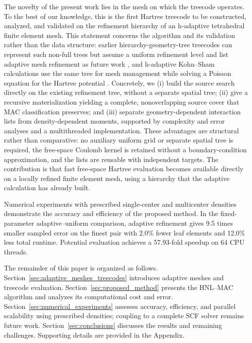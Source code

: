 \documentclass[a4paper,pdflatex,sn-mathphys-num]{sn-jnl}
\theoremstyle{thmstyleone}
\begin{document}
The novelty of the present work lies in the mesh on which the treecode
operates. To the best of our knowledge, this is the first Hartree treecode to be
constructed, analyzed, and validated on the refinement hierarchy of an
h-adaptive tetrahedral finite element mesh. This statement concerns the
algorithm and its validation rather than the data structure: earlier
hierarchy-geometry-tree treecodes can represent such non-full trees but assume a
uniform refinement level and list adaptive mesh refinement as future work
\cite{Cui,CuiYang2025,CuiYangHu2025}, and h-adaptive Kohn--Sham calculations use the same tree
for mesh management while solving a Poisson equation for the Hartree potential
\cite{Kuang2024}. Concretely, we (i) build the source search directly on the
existing refinement tree, without a separate spatial tree; (ii) give a recursive
materialization yielding a complete, nonoverlapping source cover that MAC
classification preserves; and (iii) separate geometry-dependent interaction
lists from density-dependent moments, supported by complexity and error
analyses and a multithreaded implementation. These advantages are structural
rather than comparative: no auxiliary uniform grid or separate spatial tree is
required, the free-space Coulomb kernel is retained without a
boundary-condition approximation, and the lists are reusable with independent
targets. The contribution is that fast free-space Hartree evaluation
becomes available directly on a locally refined finite element mesh, using a
hierarchy that the adaptive calculation has already built.

Numerical experiments with prescribed single-center and multicenter densities demonstrate the accuracy and efficiency of the proposed method. In the fixed-parameter adaptive--uniform comparison, adaptive refinement gives 9.5 times smaller sampled error on the finest pair with 2.0\% fewer leaf elements and 12.0\% less total runtime. Potential evaluation achieves a 57.93-fold speedup on 64 CPU threads.

The remainder of this paper is organized as follows. Section~\ref{sec:adaptive_meshes_treecodes} introduces adaptive meshes and treecode evaluation. Section~\ref{sec:proposed_method} presents the HNL–MAC algorithm and analyzes its computational cost and error. Section~\ref{sec:numerical_experiments} assesses accuracy, efficiency, and parallel scalability using prescribed densities; coupling to a complete SCF solver remains future work. Section~\ref{sec:conclusions} discusses the results and remaining challenges. Supporting details are provided in the Appendix.
\end{document}
